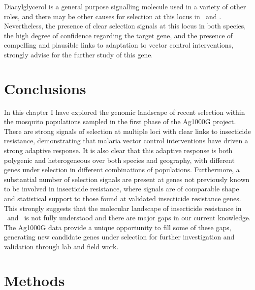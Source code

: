 \documentclass[a4paper,11pt,abstracton,hidelinks]{scrartcl}
\begin{document}
Diacylglycerol is a general purpose signalling molecule used in a variety of other roles, and there may be other causes for selection at this locus in \agam\ and \acol.
%
Nevertheless, the presence of clear selection signals at this locus in both species, the high degree of confidence regarding the target gene, and the presence of compelling and plausible links to adaptation to vector control interventions, strongly advise for the further study of this gene.


\section{Conclusions}\label{sec:conclusions}


In this chapter I have explored the genomic landscape of recent selection within the mosquito populations sampled in the first phase of the Ag1000G project.
%
There are strong signals of selection at multiple loci with clear links to insecticide resistance, demonstrating that malaria vector control interventions have driven a strong adaptive response.
%
It is also clear that this adaptive response is both polygenic and heterogeneous over both species and geography, with different genes under selection in different combinations of populations.
%
Furthermore, a substantial number of selection signals are present at genes not previously known to be involved in insecticide resistance, where signals are of comparable shape and statistical support to those found at validated insecticide resistance genes.
%
This strongly suggests that the molecular landscape of insecticide resistance in \agam\ and \acol\ is not fully understood and there are major gaps in our current knowledge.
%
The Ag1000G data provide a unique opportunity to fill some of these gaps, generating new candidate genes under selection for further investigation and validation through lab and field work.


\section{Methods}\label{sec:methods}
\end{document}
